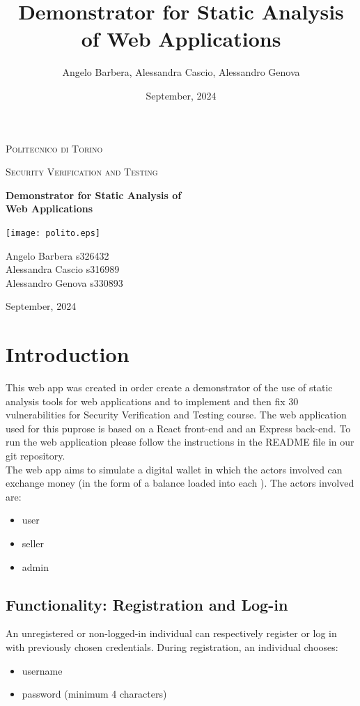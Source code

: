 \documentclass[]{article}
\title{\huge Demonstrator for Static Analysis of Web Applications}
\author{Angelo Barbera, Alessandra Cascio, Alessandro Genova}
\date{September, 2024}
\begin{document}
\begin{titlepage}
	\centering
   
	{\scshape\LARGE Politecnico di Torino \par}
	\vspace{0.6cm}
	{\scshape\Large Security Verification and Testing \par}
	\vspace{1.8cm}
    {\huge\bfseries Demonstrator for Static Analysis of \\Web Applications \par}
	\vspace{8cm}
    \texttt{[image: polito.eps]}    
	\vfill
	{\large Angelo Barbera s326432 \\ Alessandra Cascio s316989 \\ Alessandro Genova s330893 \par}
    
    \vspace{0.5cm}
    {\large September, 2024\par}
\end{titlepage}


\tableofcontents

\clearpage
{}


\section{Introduction}
This web app was created in order create a demonstrator of the use of static analysis tools for web applications and to implement and then fix 30 vulnerabilities for Security Verification and Testing course. 
The web application used for this puprose is based on a React front-end and an Express back-end.
To run the web application please follow the instructions in the README file in our git repository. \\
The web app aims to simulate a digital wallet in which the actors involved can exchange money (in the form of a balance loaded into each ). The actors involved are: 
\begin{itemize}
\item user
\item seller
\item admin 
\end{itemize}
\subsection{Functionality: Registration and Log-in}
An unregistered or non-logged-in individual can respectively register or log in with previously chosen credentials. 
During registration, an individual chooses:
\begin{itemize}
    \item username
    \item password (minimum 4 characters)
\end{itemize}
\end{document}

